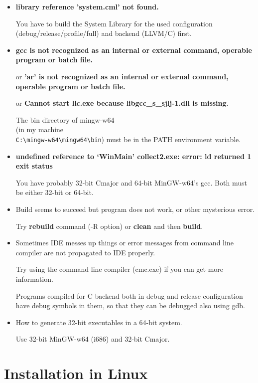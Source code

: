 \documentclass[oneside, a4paper, 11pt]{article}
\begin{document}
\begin{itemize}

\item
\textbf{library reference 'system.cml' not found.}

You have to build the System Library for the used configuration (debug/release/profile/full) and backend (LLVM/C) first.

\item

\textbf{gcc is not recognized as an internal or external command, operable program or batch file.}

or \textbf{'ar' is not recognized as an internal or external command, operable program or batch file.}

or \textbf{Cannot start llc.exe because libgcc\_s\_sjlj-1.dll is missing}.

The bin directory of mingw-w64\\
(in my machine\\
\verb|C:\mingw-w64\mingw64\bin|)
must be in the PATH environment variable.

\item
\textbf{undefined reference to `WinMain' collect2.exe: error: ld returned 1 exit status}

You have probably 32-bit Cmajor and 64-bit MinGW-w64's gcc.
Both must be either 32-bit or 64-bit.

\item
Build seems to succeed but program does not work, or other mysterious error.

Try \textbf{rebuild} command (-R option) or \textbf{clean} and then \textbf{build}.

\item
Sometimes IDE messes up things or error messages from command line compiler are not propagated to IDE properly.

Try using the command line compiler (cmc.exe) if you can get more information.

Programs compiled for C backend both in debug and release configuration have debug symbols in them,
so that they can be debugged also using gdb.

\item
How to generate 32-bit executables in a 64-bit system.

Use 32-bit MinGW-w64 (i686) and 32-bit Cmajor.
\end{itemize}

\section{Installation in Linux}
\end{document}
